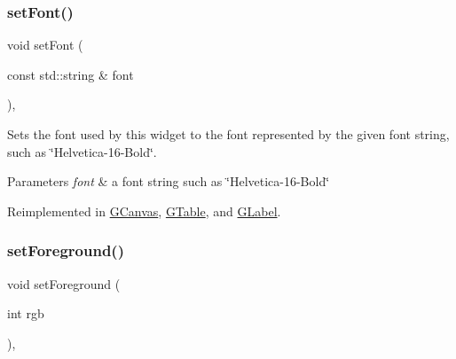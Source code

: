 \mbox{\label{classGInteractor_a8e096e8818d838aceae1d46d58fb3a7b}} 
\subsubsection{\texorpdfstring{set\+Font()}{setFont()}\hspace{0.1cm}{\footnotesize\ttfamily [2/2]}}
{\footnotesize\ttfamily void set\+Font (\begin{DoxyParamCaption}\item[{const std\+::string \&}]{font }\end{DoxyParamCaption})\hspace{0.3cm}{\ttfamily [virtual]}, {\ttfamily [inherited]}}



Sets the font used by this widget to the font represented by the given font string, such as \char`\"{}\+Helvetica-\/16-\/\+Bold\char`\"{}. 


\begin{DoxyParams}{Parameters}
{\em font} & a font string such as \char`\"{}\+Helvetica-\/16-\/\+Bold\char`\"{} \\
\hline
\end{DoxyParams}


Reimplemented in \mbox{\hyperlink{classGCanvas_a51367c9fd2709973b1f7238734f93891}{G\+Canvas}}, \mbox{\hyperlink{classGTable_a51367c9fd2709973b1f7238734f93891}{G\+Table}}, and \mbox{\hyperlink{classGLabel_a51367c9fd2709973b1f7238734f93891}{G\+Label}}.

\mbox{\label{classGInteractor_a9eb856b5ff83a19df3831a31f15f4563}} 
\subsubsection{\texorpdfstring{set\+Foreground()}{setForeground()}\hspace{0.1cm}{\footnotesize\ttfamily [1/2]}}
{\footnotesize\ttfamily void set\+Foreground (\begin{DoxyParamCaption}\item[{int}]{rgb }\end{DoxyParamCaption})\hspace{0.3cm}{\ttfamily [virtual]}, {\ttfamily [inherited]}}



